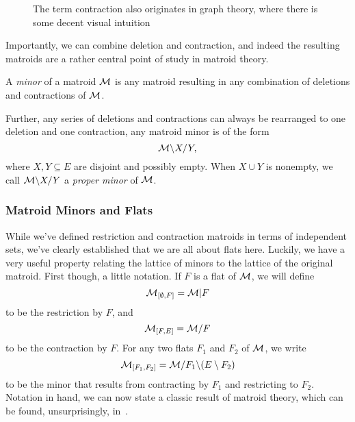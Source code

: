 \documentclass[12pt,oneside]{../../sfsuthesis}
\begin{document}
\begin{figure}[H]
\begin{subfigure}[t]{.45\textwidth}
    \end{subfigure}
    \caption{The term contraction also originates in graph theory, where there is some decent visual intuition}\label{fig:contractionMatroid}

\end{figure}

Importantly, we can combine deletion and contraction, and indeed the resulting matroids are a rather central point of study in matroid theory.

\begin{definition}\th\label{def:minor}
    A \emph{minor} of a matroid \( \mathcal{M} \) is any matroid resulting in any combination of deletions and contractions of \( \mathcal{M} \).

    Further, any series of deletions and contractions can always be rearranged to one deletion and one contraction, any matroid minor is of the form
    \[
        \mathcal{M} \backslash X / Y,
    \]
    where \( X, Y \subseteq E \) are disjoint and possibly empty.
    When \( X \cup Y \) is nonempty, we call \( \mathcal{M} \backslash X / Y \) a \emph{proper minor} of \( \mathcal{M} \).
\end{definition}

\subsubsection{Matroid Minors and Flats}

While we've defined restriction and contraction matroids in terms of independent sets, we've clearly established that we are all about flats here.
Luckily, we have a very useful property relating the lattice of minors to the lattice of the original matroid.
First though, a little notation.
If \( F \) is a flat of \( \mathcal{M} \), we will define
\[
    \mathcal{M}_{[\emptyset, F]} = \mathcal{M}|F
\]
to be the restriction by \( F \), and
\[
    \mathcal{M}_{[F, E]} = \mathcal{M}  / F
\]
to be the contraction by \( F \).
For any two flats \( F_1 \) and \( F_2 \) of \( \mathcal{M} \), we write
\[
    \mathcal{M}_{[F_1, F_2]} = \mathcal{M} / F_1 \backslash (E \setminus F_2)
\]
to be the minor that results from contracting by \( F_1 \) and restricting to \( F_2 \).
Notation in hand, we can now state a classic result of matroid theory, which can be found, unsurprisingly, in~\cite[p.~116]{oxleyMatroidTheory2011}.
\end{document}
